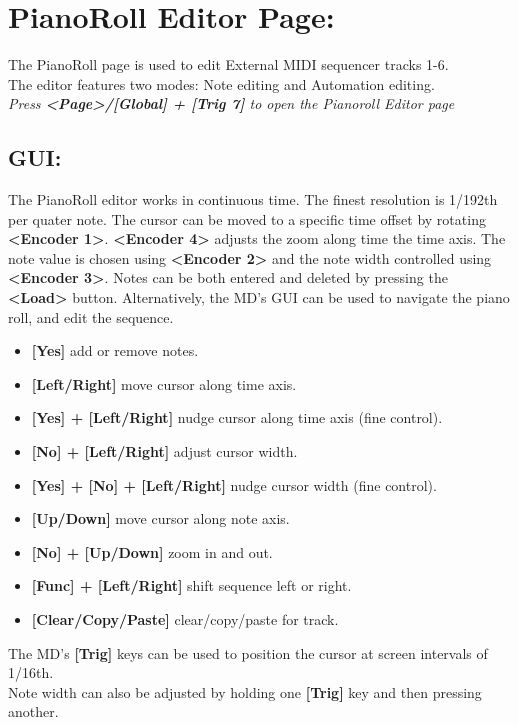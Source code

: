 \chapter{PianoRoll Editor Page:}
The PianoRoll page is used to edit External MIDI sequencer tracks 1-6.\\
The editor features two modes: Note editing and Automation editing.
\\
\textit{Press \textbf{<Page>/[Global] + [Trig 7]} to open the Pianoroll Editor page}
\section{GUI:}
The PianoRoll editor works in continuous time. The finest resolution is 1/192th per quater note. The cursor can be moved to a specific time offset by rotating \textbf{<Encoder 1>}. \textbf{<Encoder 4>} adjusts the zoom along time the time axis. The note value is chosen using \textbf{<Encoder 2>} and the note width controlled using \textbf{<Encoder 3>}. Notes can be both entered and deleted by pressing the \textbf{<Load>} button.
\newpage
Alternatively, the MD's GUI can be used to navigate the piano roll, and edit the sequence.
\begin{itemize}
     \item \textbf{[Yes]} add or remove notes.
     \item \textbf{[Left/Right]} move cursor along time axis.
     \item \textbf{[Yes] + [Left/Right]} nudge cursor along time axis (fine control).
     \item \textbf{[No] + [Left/Right]} adjust cursor width.
     \item \textbf{[Yes] + [No] + [Left/Right]} nudge cursor width (fine control).
     \item \textbf{[Up/Down]} move cursor along note axis.
     \item \textbf{[No] + [Up/Down]} zoom in and out.
     \item \textbf{[Func] + [Left/Right]} shift sequence left or right.
     \item \textbf{[Clear/Copy/Paste]} clear/copy/paste for track.
\end{itemize}
The MD's \textbf{[Trig]} keys can be used to position the cursor at screen intervals of 1/16th.\\
Note width can also be adjusted by holding one \textbf{[Trig]} key and then pressing another.
